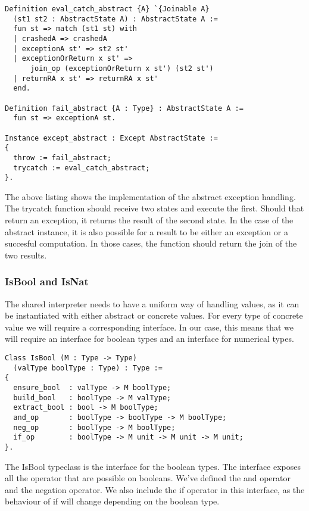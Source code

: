 \begin{verbatim}
Definition eval_catch_abstract {A} `{Joinable A} 
  (st1 st2 : AbstractState A) : AbstractState A :=
  fun st => match (st1 st) with
  | crashedA => crashedA 
  | exceptionA st' => st2 st'
  | exceptionOrReturn x st' => 
      join_op (exceptionOrReturn x st') (st2 st')
  | returnRA x st' => returnRA x st'
  end.

Definition fail_abstract {A : Type} : AbstractState A :=
  fun st => exceptionA st.

Instance except_abstract : Except AbstractState := 
{
  throw := fail_abstract;
  trycatch := eval_catch_abstract;
}.
\end{verbatim}

The above listing shows the implementation of the abstract exception handling.
The trycatch function should receive two states and execute the first. Should
that return an exception, it returns the result of the second state. In the
case of the abstract instance, it is also possible for a result to be either
an exception or a succesful computation. In those cases, the function should
return the join of the two results.

\subsubsection{IsBool and IsNat}
The shared interpreter needs to have a uniform way of handling values, as it
can be instantiated with either abstract or concrete values. For every type of
concrete value we will require a corresponding interface. In our case, this
means that we will require an interface for boolean types and an interface for
numerical types.

\begin{verbatim}
Class IsBool (M : Type -> Type)
  (valType boolType : Type) : Type :=
{
  ensure_bool  : valType -> M boolType;
  build_bool   : boolType -> M valType;
  extract_bool : bool -> M boolType;
  and_op       : boolType -> boolType -> M boolType;
  neg_op       : boolType -> M boolType;
  if_op        : boolType -> M unit -> M unit -> M unit;
}.
\end{verbatim}

The IsBool typeclass is the interface for the boolean types. The interface
exposes all the operator that are possible on booleans. We've defined the and
operator and the negation operator. We also include the if operator in this
interface, as the behaviour of if will change depending on the boolean type. 


